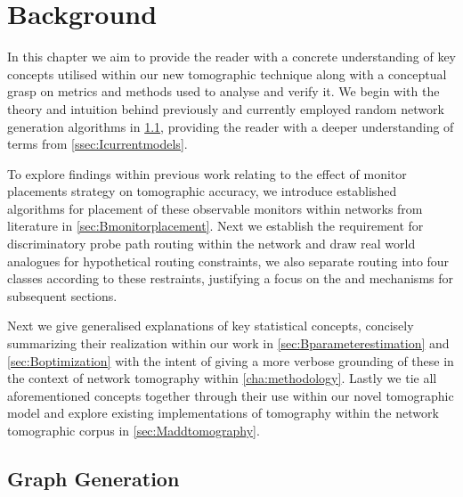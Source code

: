 \chapter{Background}
\label{cha:background}

In this chapter we aim to provide the reader with a concrete understanding of key concepts utilised within our new tomographic technique along with a conceptual grasp on metrics and methods used to analyse and verify it. We begin with the theory and intuition behind previously and currently employed random network generation algorithms in \cref{sec:Bgraphgeneration}, providing the reader with a deeper understanding of terms from \cref{ssec:Icurrentmodels}.\par
To explore findings within previous work relating to the effect of monitor placements strategy on tomographic accuracy, we introduce established algorithms for placement of these observable monitors within networks from literature in \cref{sec:Bmonitorplacement}. Next we establish the requirement for discriminatory probe path routing within the network and draw real world analogues for hypothetical routing constraints, we also separate routing into four classes according to these restraints, justifying a focus on the \cbr and \cfr mechanisms for subsequent sections.\par
Next we give generalised explanations of key statistical concepts, concisely summarizing their realization within our work in \cref{sec:Bparameterestimation} and \cref{sec:Boptimization} with the intent of giving a more verbose grounding of these in the context of network tomography within \cref{cha:methodology}. Lastly we tie all aforementioned concepts together through their use within our novel tomographic model and explore existing implementations of \pdv tomography within the network tomographic corpus in \cref{sec:Maddtomography}.

\section{Graph Generation}
\label{sec:Bgraphgeneration}

